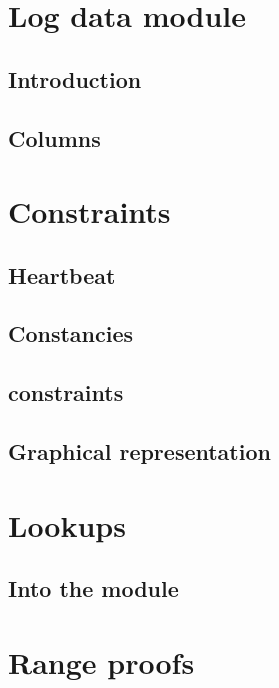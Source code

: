\section{Log data module}                            \label{log data: generalities}
\subsection{Introduction}                            \label{log data: generalities: intro}                 
\subsection{Columns}                                 \label{log data: generalities: columns}               

\section{Constraints}                                \label{log data: constraints}
\subsection{Heartbeat}                               \label{log data: constraints: heartbeat}              
\subsection{Constancies}                             \label{log data: constraints: constancies}            
\subsection{\logLogsData{} constraints}              \label{log data: constraints: log logs data}          
\subsection{Graphical representation}                \label{log data: constraints: graphical rep data}     

\section{Lookups}                                    \label{log data: lookups}
\subsection{Into the \rlpTxnRcptMod{} module}        \label{log data: lookups: into txn rlp}               

\section{Range proofs}                               \label{log data: range proofs}                        
